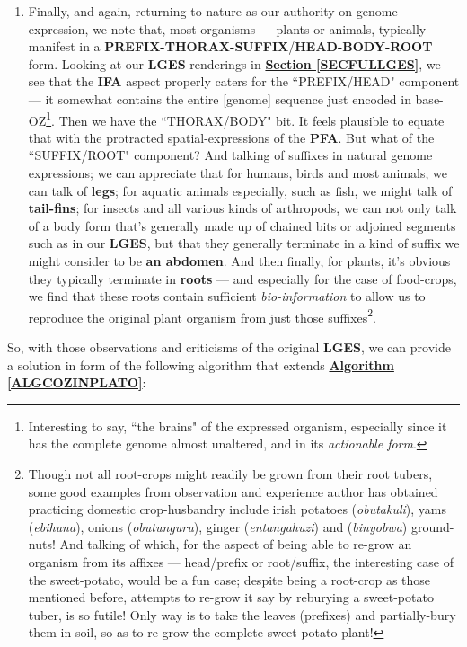 \documentclass[a4paper, 18pt]{book} %
\begin{document}
\begin{enumerate}
\item Finally, and again, returning to nature as our authority on genome expression, we note that, most organisms --- plants or animals, typically manifest in a \textbf{PREFIX-THORAX-SUFFIX}/\textbf{HEAD-BODY-ROOT} form. Looking at our \textbf{LGES} renderings in \textbf{\hyperref[SECFULLGES]{Section \ref{SECFULLGES}}}, we see that the \textbf{IFA} aspect properly caters for the ``PREFIX/HEAD" component --- it somewhat contains the entire [genome] sequence just encoded in base-OZ\footnote{Interesting to say, ``the brains" of the expressed organism, especially since it has the complete genome almost unaltered, and in its \textit{actionable form}.}. Then we have the ``THORAX/BODY" bit. It feels plausible to equate that with the protracted spatial-expressions of the \textbf{PFA}. But what of the ``SUFFIX/ROOT" component? And talking of suffixes in natural genome expressions; we can appreciate that for humans, birds and most animals, we can talk of \textbf{legs}; for aquatic animals especially, such as fish, we might talk of \textbf{tail-fins}; for insects and all various kinds of arthropods, we can not only talk of a body form that's generally made up of chained bits or adjoined segments such as in our \textbf{LGES}, but that they generally terminate in a kind of suffix we might consider to be \textbf{an abdomen}. And then finally, for plants, it's obvious they typically terminate in \textbf{roots} --- and especially for the case of food-crops, we find that these roots contain sufficient \textit{bio-information} to allow us to reproduce the original plant organism from just those suffixes\footnote{Though not all root-crops might readily be grown from their root tubers, some good examples from observation and experience author has obtained practicing domestic crop-husbandry include irish potatoes (\textit{obutakuli}), yams (\textit{ebihuna}), onions (\textit{obutunguru}), ginger (\textit{entangahuzi}) and (\textit{binyobwa}) ground-nuts! And talking of which, for the aspect of being able to re-grow an organism from its affixes --- head/prefix or root/suffix, the interesting case of the sweet-potato, would be a fun case; despite being a root-crop as those mentioned before, attempts to re-grow it say by reburying a sweet-potato tuber, is so futile! Only way is to take the leaves (prefixes) and partially-bury them in soil, so as to re-grow the complete sweet-potato plant!}.
\end{enumerate}

So, with those observations and criticisms of the original \textbf{LGES}, we can provide a solution in form of the following algorithm that extends \textbf{\hyperref[ALGCOZINPLATO]{Algorithm \ref{ALGCOZINPLATO}}}:
\end{document}
